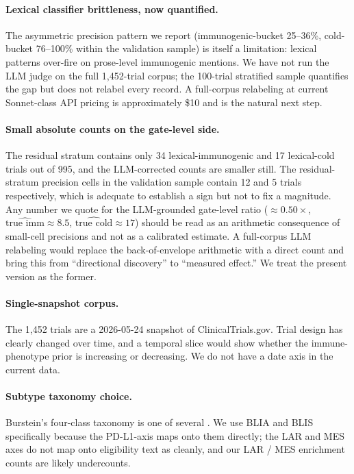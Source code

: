\documentclass{article}
\begin{document}
\paragraph{Lexical classifier brittleness, now quantified.}
The asymmetric precision pattern we report
(immunogenic-bucket 25--36\%, cold-bucket 76--100\% within the
validation sample) is itself a limitation: lexical patterns over-fire
on prose-level immunogenic mentions.  We have not run the LLM judge
on the full 1{,}452-trial corpus; the 100-trial stratified sample
quantifies the gap but does not relabel every record.  A full-corpus
relabeling at current Sonnet-class API pricing is approximately
\$10 and is the natural next step.

\paragraph{Small absolute counts on the gate-level side.}
The residual stratum contains only 34 lexical-immunogenic and 17
lexical-cold trials out of 995, and the LLM-corrected counts are
smaller still.  The residual-stratum precision cells in the
validation sample contain 12 and 5 trials respectively, which is
adequate to establish a sign but not to fix a magnitude.  Any number
we quote for the LLM-grounded gate-level ratio
($\approx 0.50\times$, $\widehat{\text{true imm}} \approx 8.5$,
$\widehat{\text{true cold}} \approx 17$) should be read as
an arithmetic consequence of small-cell precisions and not as a
calibrated estimate.  A full-corpus LLM relabeling would replace the
back-of-envelope arithmetic with a direct count and bring this from
``directional discovery'' to ``measured effect.''  We treat the
present version as the former.

\paragraph{Single-snapshot corpus.}
The 1{,}452 trials are a 2026-05-24 snapshot of ClinicalTrials.gov.
Trial design has clearly changed over time, and a temporal slice
would show whether the immune-phenotype prior is increasing or
decreasing.  We do not have a date axis in the current data.

\paragraph{Subtype taxonomy choice.}
Burstein's four-class taxonomy is one of several
\cite{hossain2021}.  We use BLIA and BLIS specifically because the
PD-L1-axis maps onto them directly; the LAR and MES axes do not map
onto eligibility text as cleanly, and our LAR / MES enrichment
counts are likely undercounts.
\end{document}
